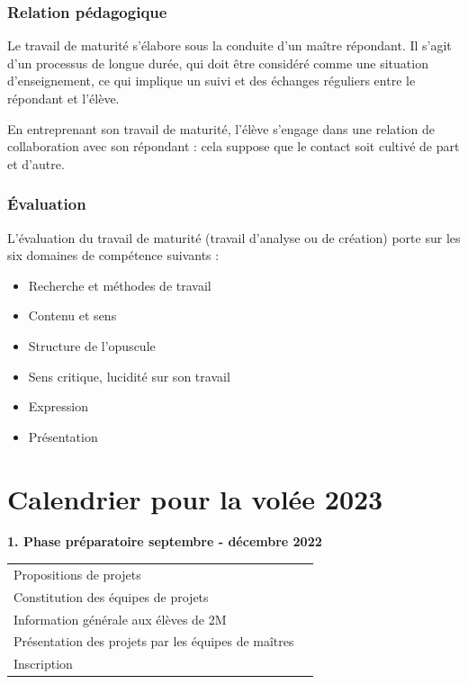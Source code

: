\documentclass[
  10pt,
  french,
  a5paper,
  openany]{book}
\providecommand{\tightlist}{%
  \setlength{\itemsep}{0pt}\setlength{\parskip}{0pt}}
\begin{document}
\hypertarget{relation-puxe9dagogique}{%
\subsection*{Relation pédagogique}\label{relation-puxe9dagogique}}

Le travail de maturité s'élabore sous la conduite d'un maître répondant. Il s'agit d'un processus de longue durée, qui doit être considéré comme une situation d'enseignement, ce qui implique un suivi et des échanges réguliers entre le répondant et l'élève.

En entreprenant son travail de maturité, l'élève s'engage dans une relation de collaboration avec son répondant : cela suppose que le contact soit cultivé de part et d'autre.

\hypertarget{uxe9valuation-1}{%
\subsection*{Évaluation}\label{uxe9valuation-1}}

L'évaluation du travail de maturité (travail d'analyse ou de création) porte sur les six domaines de compétence suivants :

\begin{itemize}
\tightlist
\item
  Recherche et méthodes de travail
\item
  Contenu et sens
\item
  Structure de l'opuscule
\item
  Sens critique, lucidité sur son travail
\item
  Expression
\item
  Présentation
\end{itemize}

\hypertarget{calendrier-pour-la-voluxe9e-2023}{%
\chapter*{Calendrier pour la volée 2023}\label{calendrier-pour-la-voluxe9e-2023}}


\textbf{1. Phase préparatoire \hfill septembre - décembre 2022}

\begin{longtable}[]{@{}ll@{}}
\toprule
\endhead
Propositions de projets &\tabularnewline
Constitution des équipes de projets &\tabularnewline
Information générale aux élèves de 2M &\tabularnewline
Présentation des projets par les équipes de maîtres &\tabularnewline
Inscription &\tabularnewline
\bottomrule
\end{longtable}
\end{document}
